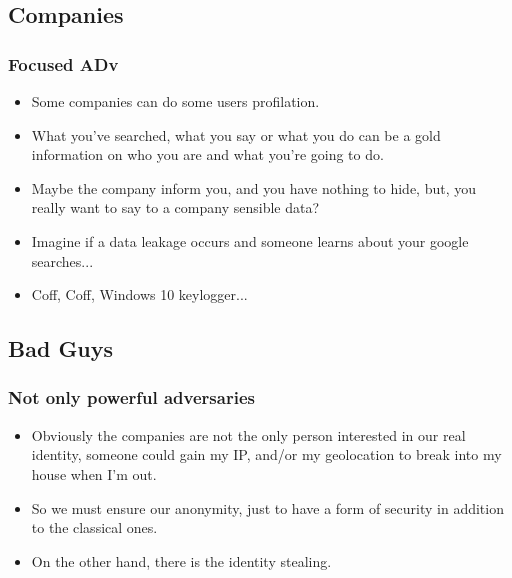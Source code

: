 \subsection{Companies}
\begin{frame}
	\frametitle{Focused ADv}
	\begin{itemize}
		\item Some companies can do some users profilation.
		\item What you've searched, what you say or what you do can be a
		gold information on who you are and what you're going to do.
		\item Maybe the company inform you, and you have nothing to
		hide, but, you really want to say to a company sensible data?
		\item Imagine if a data leakage occurs and someone learns about
		your google searches...
		\item Coff, Coff, Windows 10 keylogger...
	\end{itemize}
\end{frame}

\subsection{Bad Guys}
\begin{frame}
	\frametitle{Not only powerful adversaries}
	\begin{itemize}
		\item Obviously the companies are not the only person interested
		in our real identity, someone could gain my IP, and/or my
		geolocation to break into my
		house when I'm out.
		\item So we must ensure our anonymity, just to have a form of
		security in addition to the classical ones.
		\item On the other hand, there is the identity stealing.
	\end{itemize}
\end{frame}
